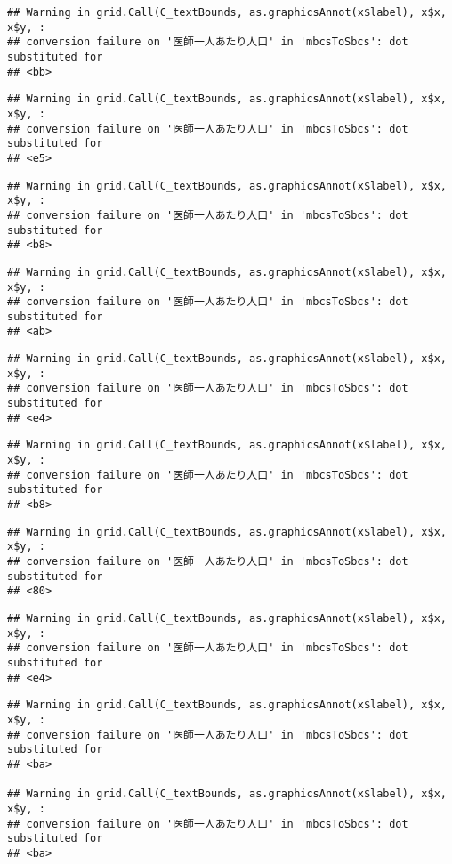 \documentclass[
]{article}
\begin{document}
\begin{verbatim}
## Warning in grid.Call(C_textBounds, as.graphicsAnnot(x$label), x$x, x$y, :
## conversion failure on '医師一人あたり人口' in 'mbcsToSbcs': dot substituted for
## <bb>
\end{verbatim}

\begin{verbatim}
## Warning in grid.Call(C_textBounds, as.graphicsAnnot(x$label), x$x, x$y, :
## conversion failure on '医師一人あたり人口' in 'mbcsToSbcs': dot substituted for
## <e5>
\end{verbatim}

\begin{verbatim}
## Warning in grid.Call(C_textBounds, as.graphicsAnnot(x$label), x$x, x$y, :
## conversion failure on '医師一人あたり人口' in 'mbcsToSbcs': dot substituted for
## <b8>
\end{verbatim}

\begin{verbatim}
## Warning in grid.Call(C_textBounds, as.graphicsAnnot(x$label), x$x, x$y, :
## conversion failure on '医師一人あたり人口' in 'mbcsToSbcs': dot substituted for
## <ab>
\end{verbatim}

\begin{verbatim}
## Warning in grid.Call(C_textBounds, as.graphicsAnnot(x$label), x$x, x$y, :
## conversion failure on '医師一人あたり人口' in 'mbcsToSbcs': dot substituted for
## <e4>
\end{verbatim}

\begin{verbatim}
## Warning in grid.Call(C_textBounds, as.graphicsAnnot(x$label), x$x, x$y, :
## conversion failure on '医師一人あたり人口' in 'mbcsToSbcs': dot substituted for
## <b8>
\end{verbatim}

\begin{verbatim}
## Warning in grid.Call(C_textBounds, as.graphicsAnnot(x$label), x$x, x$y, :
## conversion failure on '医師一人あたり人口' in 'mbcsToSbcs': dot substituted for
## <80>
\end{verbatim}

\begin{verbatim}
## Warning in grid.Call(C_textBounds, as.graphicsAnnot(x$label), x$x, x$y, :
## conversion failure on '医師一人あたり人口' in 'mbcsToSbcs': dot substituted for
## <e4>
\end{verbatim}

\begin{verbatim}
## Warning in grid.Call(C_textBounds, as.graphicsAnnot(x$label), x$x, x$y, :
## conversion failure on '医師一人あたり人口' in 'mbcsToSbcs': dot substituted for
## <ba>

## Warning in grid.Call(C_textBounds, as.graphicsAnnot(x$label), x$x, x$y, :
## conversion failure on '医師一人あたり人口' in 'mbcsToSbcs': dot substituted for
## <ba>
\end{verbatim}
\end{document}
